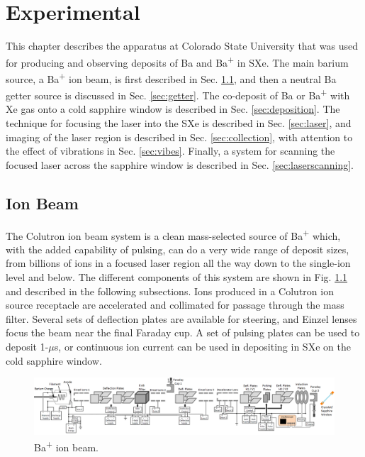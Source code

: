 \chapter{Experimental}



This chapter describes the apparatus at Colorado State University that was used for producing and observing  deposits of Ba and Ba\textsuperscript{+} in SXe.  The main barium source, a Ba\textsuperscript{+} ion beam, is first described in Sec. \ref{sec:ionbeam}, and then a neutral Ba getter source is discussed in Sec. \ref{sec:getter}.  The co-deposit of Ba or Ba\textsuperscript{+} with Xe gas onto a cold sapphire window is described in Sec. \ref{sec:deposition}.  The technique for focusing the laser into the SXe is described in Sec. \ref{sec:laser}, and imaging of the laser region is described in Sec. \ref{sec:collection}, with attention to the effect of vibrations in Sec. \ref{sec:vibes}.  Finally, a system for scanning the focused laser across the sapphire window is described in Sec. \ref{sec:laserscanning}.

\section{Ion Beam}
\label{sec:ionbeam}

The Colutron ion beam system is a clean mass-selected source of Ba\textsuperscript{+} which, with the added capability of pulsing, can do a very wide range of deposit sizes, from billions of ions in a focused laser region all the way down to the single-ion level and below.  The different components of this system are shown in Fig. \ref{fig:ionbeam} and described in the following subsections.  Ions produced in a Colutron ion source receptacle are accelerated and collimated for passage through the mass filter.  Several sets of deflection plates are available for steering, and Einzel lenses focus the beam near the final Faraday cup.  A set of pulsing plates can be used to deposit 1-$\mu$s, or continuous ion current can be used in depositing in SXe on the cold sapphire window.

\vspace{20mm}

\begin{figure} %
        \centering
                \includegraphics[angle=90,width=.25\textwidth]{figures/ionBeam.png} %
                \caption{Ba\textsuperscript{+} ion beam.}
\label{fig:ionbeam}
\end{figure}

